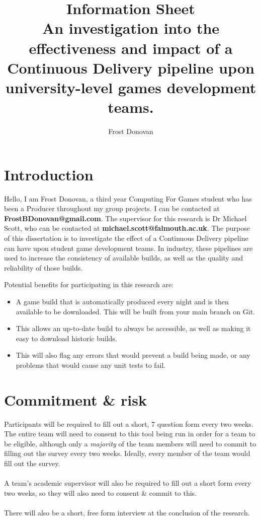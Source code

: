 \documentclass{article}
\begin{document}
    \title{Information Sheet \\
    An investigation into the effectiveness and impact of a Continuous Delivery pipeline upon university-level games development teams.}
    \author{Frost Donovan}

    \maketitle

    \section{Introduction}
        Hello, I am Frost Donovan, a third year Computing For Games student who has been a Producer throughout my group projects. I can be contacted at \textbf{FrostBDonovan@gmail.com}. The supervisor for this research is Dr Michael Scott, who can be contacted at \textbf{michael.scott@falmouth.ac.uk}.
        The purpose of this dissertation is to investigate the effect of a Continuous Delivery pipeline can have upon student game development teams. In industry, these pipelines are used to increase the consistency of available builds, as well as the quality and reliability of those builds. 

        Potential benefits for participating in this research are:
        \begin{itemize}
            \item A game build that is automatically produced every night and is then available to be downloaded. This will be built from your main branch on Git.
            \item This allows an up-to-date build to always be accessible, as well as making it easy to download historic builds.
            \item This will also flag any errors that would prevent a build being made, or any problems that would cause any unit tests to fail. 
        \end{itemize}

    \section{Commitment \& risk}
        Participants will be required to fill out a short, 7 question form every two weeks.
        The entire team will need to consent to this tool being run in order for a team to be eligible, although only a \textit{majority} of the team members will need to commit to filling out the survey every two weeks. Ideally, every member of the team would fill out the survey. 
        \\ \\
        A team's academic supervisor will also be required to fill out a short form every two weeks, so they will also need to consent \& commit to this.
        \\ \\
        There will also be a short, free form interview at the conclusion of the research.
        
\end{document}
